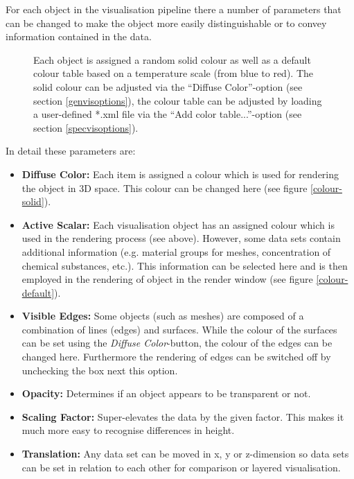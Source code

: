 For each object in the visualisation pipeline there a number of parameters that can be changed to make the object more easily distinguishable or to convey information contained in the data.

\begin{figure}[tb]
\begin{center}
\enspace
{}\enspace
{}
\end{center}
\caption{Each object is assigned a random solid colour as well as a default colour table based on a temperature scale (from blue to red). The solid colour can be adjusted via the ``Diffuse Color''-option (see section \ref{genvisoptions}), the colour table can be adjusted by loading a user-defined *.xml file via the ``Add color table...''-option (see section \ref{specvisoptions}).} \label{fig:colours}
\end{figure}

In detail these parameters are:

\begin{itemize}
\item \textbf{Diffuse Color:} Each item is assigned a colour which is used for rendering the object in 3D space. This colour can be changed here (see figure \ref{colour-solid}).
\item \textbf{Active Scalar:} Each visualisation object has an assigned colour which is used in the rendering process (see above). However, some data sets contain additional information (e.g. material groups for meshes, concentration of chemical substances, etc.). This information can be selected here and is then employed in the rendering of object in the render window (see figure \ref{colour-default}).
\item \textbf{Visible Edges:} Some objects (such as meshes) are composed of a combination of lines (edges) and surfaces. While the colour of the surfaces can be set using the \emph{Diffuse Color}-button, the colour of the edges can be changed here. Furthermore the rendering of edges can be switched off by unchecking the box next this option.
\item \textbf{Opacity:} Determines if an object appears to be transparent or not.
\item \textbf{Scaling Factor:} Super-elevates the data by the given factor. This makes it much more easy to recognise differences in height.
\item \textbf{Translation:} Any data set can be moved in x, y or z-dimension so data sets can be set in relation to each other for comparison or layered visualisation.
\end{itemize}



